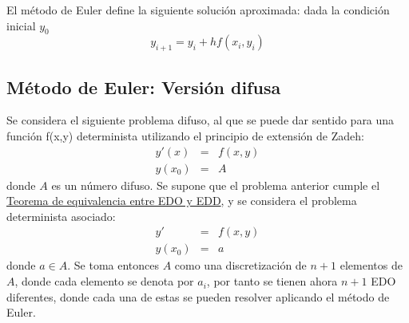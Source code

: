 El método de Euler define la siguiente solución aproximada: dada la condición inicial $y_0$
\[
	y_{i+1} = y_i + h f(x_i, y_i)
\]

\subsection{Método de Euler: Versión difusa}
Se considera el siguiente problema difuso, al que se puede dar sentido para una función f(x,y) determinista utilizando el principio de extensión de Zadeh:
\[
	\begin{array}{ccc}
		y'(x) & = &f(x, y)  \\
		y(x_0) & = & A
	\end{array}
\]
donde $A$ es un número difuso. Se supone que el problema anterior cumple el \hyperref[teorema:equivalencia]{Teorema de equivalencia entre EDO y EDD}, y se considera el problema determinista asociado:
\[
	\begin{array}{ccc}
		y' & = &f(x, y)  \\
		y(x_0) & = & a
	\end{array}
\]
donde $a \in A$. Se toma entonces $A$ como una discretización de $n+1$ elementos de $A$, donde cada elemento se denota por $a_i$, por tanto se tienen ahora $n+1$ EDO diferentes, donde cada una de estas se pueden resolver aplicando el método de Euler.
